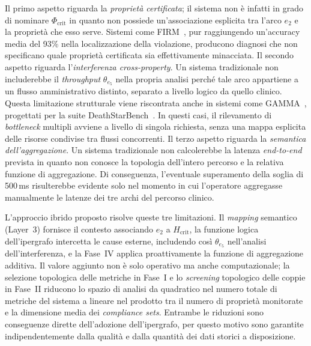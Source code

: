 Il primo aspetto riguarda la \textit{proprietà certificata}; il sistema non è infatti in grado di
nominare $\Phi_{\text{crit}}$ in quanto non possiede un'associazione esplicita tra l'arco $e_2$ e
la proprietà che esso serve. Sistemi come FIRM~\cite{qiu2020firm}, pur raggiungendo un'accuracy
media del 93\% nella localizzazione della violazione, producono diagnosi che non specificano quale
proprietà certificata sia effettivamente minacciata. Il secondo aspetto riguarda
l'\textit{interferenza cross-property}. Un sistema tradizionale non includerebbe il
\textit{throughput} $\theta_{e_5}$ nella propria analisi perché tale arco appartiene a un flusso
amministrativo distinto, separato a livello logico da quello clinico. Questa limitazione strutturale
viene riscontrata anche in sistemi come GAMMA~\cite{somashekar2024gamma}, progettati per la suite
DeathStarBench~\cite{gan2019deathstar}. In questi casi, il rilevamento di \textit{bottleneck}
multipli avviene a livello di singola richiesta, senza una mappa esplicita delle risorse condivise
tra flussi concorrenti. Il terzo aspetto riguarda la \textit{semantica dell'aggregazione}. Un
sistema tradizionale non calcolerebbe la latenza \textit{end-to-end} prevista in quanto non conosce
la topologia dell'intero percorso e la relativa funzione di aggregazione. Di conseguenza,
l'eventuale superamento della soglia di 500\,ms risulterebbe evidente solo nel momento in cui
l'operatore aggregasse manualmente le latenze dei tre archi del percorso clinico.

L'approccio ibrido proposto risolve queste tre limitazioni. Il \textit{mapping} semantico
(Layer~3) fornisce il contesto associando $e_2$ a $H_{\text{crit}}$, la funzione logica
dell'ipergrafo intercetta le cause esterne, includendo così $\theta_{e_5}$ nell'analisi
dell'interferenza, e la Fase~IV applica proattivamente la funzione di aggregazione additiva. Il
valore aggiunto non è solo operativo ma anche computazionale; la selezione topologica delle metriche
in Fase~I e lo \textit{screening} topologico delle coppie in Fase~II riducono lo spazio di analisi
da quadratico nel numero totale di metriche del sistema a lineare nel prodotto tra il numero di
proprietà monitorate e la dimensione media dei \textit{compliance sets}. Entrambe le riduzioni sono
conseguenze dirette dell'adozione dell'ipergrafo, per questo motivo sono garantite
indipendentemente dalla qualità e dalla quantità dei dati storici a disposizione.